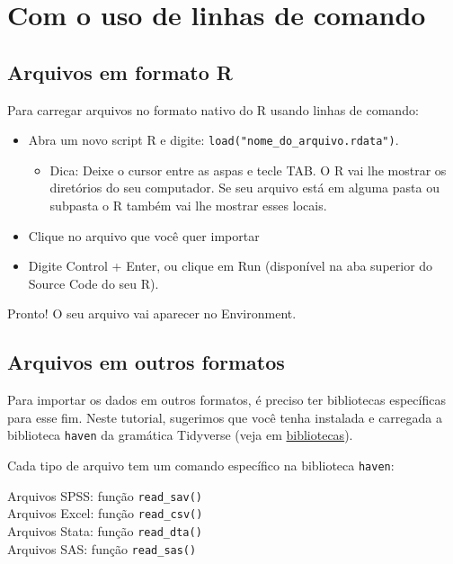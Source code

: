\documentclass[
  10pt,
  brazil,
  a4paper,
  twoside, notitlepage, openright]{book}
\providecommand{\tightlist}{%
  \setlength{\itemsep}{0pt}\setlength{\parskip}{0pt}}
\begin{document}
\hypertarget{com-o-uso-de-linhas-de-comando}{%
\section{Com o uso de linhas de comando}\label{com-o-uso-de-linhas-de-comando}}

\hypertarget{arquivos-em-formato-r-1}{%
\subsection{Arquivos em formato R}\label{arquivos-em-formato-r-1}}

Para carregar arquivos no formato nativo do R usando linhas de comando:

\begin{itemize}
\tightlist
\item
  Abra um novo script R e digite: \texttt{load("nome\_do\_arquivo.rdata")}.

  \begin{itemize}
  \tightlist
  \item
    Dica: Deixe o cursor entre as aspas e tecle TAB. O R vai lhe mostrar os diretórios do seu computador. Se seu arquivo está em alguma pasta ou subpasta o R também vai lhe mostrar esses locais.\\
  \end{itemize}
\item
  Clique no arquivo que você quer importar\\
\item
  Digite Control + Enter, ou clique em Run (disponível na aba superior do Source Code do seu R).
\end{itemize}

Pronto! O seu arquivo vai aparecer no Environment.

\hypertarget{arquivos-em-outros-formatos-1}{%
\subsection{Arquivos em outros formatos}\label{arquivos-em-outros-formatos-1}}

Para importar os dados em outros formatos, é preciso ter bibliotecas específicas para esse fim. Neste tutorial, sugerimos que você tenha instalada e carregada a biblioteca \texttt{haven} da gramática Tidyverse (veja em \protect\hyperlink{biblio}{bibliotecas}).

Cada tipo de arquivo tem um comando específico na biblioteca \texttt{haven}:

Arquivos SPSS: função \texttt{read\_sav()}\\
Arquivos Excel: função \texttt{read\_csv()}\\
Arquivos Stata: função \texttt{read\_dta()}\\
Arquivos SAS: função \texttt{read\_sas()}
\end{document}
